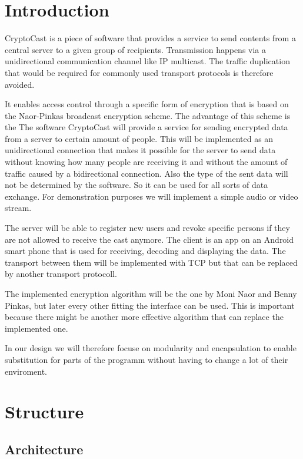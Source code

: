 \documentclass[a4paper,10pt]{scrartcl}
\title{\doctitle}
\author{\authorName}
\date{\today}
\begin{document}

\tableofcontents
\clearpage

\section{Introduction}
CryptoCast is a piece of software that provides a service to send contents from a central server to a given
group of recipients. Transmission happens via a unidirectional communication channel like IP multicast.
The traffic duplication that would be required for commonly used transport protocols is therefore avoided.

It enables access control through a specific form of encryption that is based on the Naor-Pinkas broadcast
encryption scheme. The advantage of this scheme is the 
The software CryptoCast will provide a service for sending encrypted data from a server to certain
amount of people.  This will be implemented as an unidirectional connection that makes it possible for the server
to send data without knowing how many people are receiving it and without the amount of traffic caused
by a bidirectional connection.  Also the type of the sent data will not be determined by the software. So it can be
used for all sorts of data exchange. For demonstration purposes we will implement a simple audio or video stream.

The server will be able to register new users and revoke specific persons if they are not allowed to receive the cast anymore. 
The client is an app on an Android smart phone that is used for receiving, decoding and displaying the data. 
The transport between them will be implemented with TCP but that can be replaced by another transport protocoll.

The implemented encryption algorithm will be the one by Moni Naor and Benny Pinkas, but later every other fitting the
interface can be used. This is important because there might be another more effective algorithm that can replace the implemented one.

In our design we will therefore focuse on modularity and encapsulation to enable substitution for parts of the programm without having to 
change a lot of their enviroment.

\section{Structure}
\subsection{Architecture}

\end{document}
